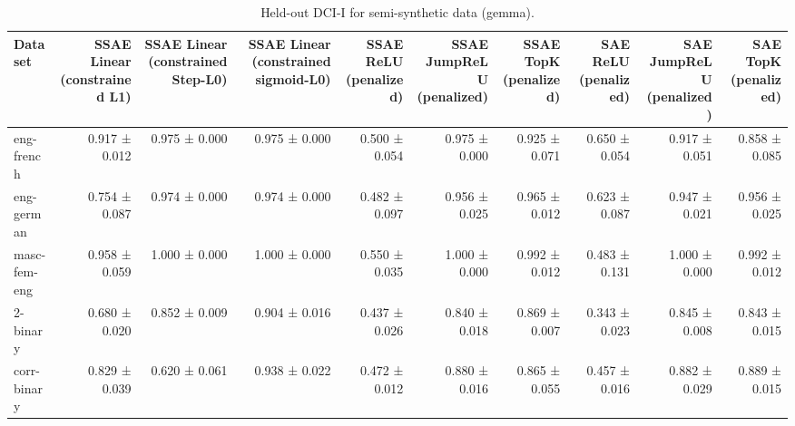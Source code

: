\begin{table}[t]
\centering
\caption{Held-out DCI-I for semi-synthetic data (gemma).}
\label{tab:semisynthetic-gemma-dci-i}
\begin{tabular}{lrrrrrrrrr}
\toprule
Dataset & SSAE Linear (constrained L1) & SSAE Linear (constrained Step-L0) & SSAE Linear (constrained sigmoid-L0) & SSAE ReLU (penalized) & SSAE JumpReLU (penalized) & SSAE TopK (penalized) & SAE ReLU (penalized) & SAE JumpReLU (penalized) & SAE TopK (penalized) \\
\midrule
eng-french & 0.917 ± 0.012 & 0.975 ± 0.000 & 0.975 ± 0.000 & 0.500 ± 0.054 & 0.975 ± 0.000 & 0.925 ± 0.071 & 0.650 ± 0.054 & 0.917 ± 0.051 & 0.858 ± 0.085 \\
eng-german & 0.754 ± 0.087 & 0.974 ± 0.000 & 0.974 ± 0.000 & 0.482 ± 0.097 & 0.956 ± 0.025 & 0.965 ± 0.012 & 0.623 ± 0.087 & 0.947 ± 0.021 & 0.956 ± 0.025 \\
masc-fem-eng & 0.958 ± 0.059 & 1.000 ± 0.000 & 1.000 ± 0.000 & 0.550 ± 0.035 & 1.000 ± 0.000 & 0.992 ± 0.012 & 0.483 ± 0.131 & 1.000 ± 0.000 & 0.992 ± 0.012 \\
2-binary & 0.680 ± 0.020 & 0.852 ± 0.009 & 0.904 ± 0.016 & 0.437 ± 0.026 & 0.840 ± 0.018 & 0.869 ± 0.007 & 0.343 ± 0.023 & 0.845 ± 0.008 & 0.843 ± 0.015 \\
corr-binary & 0.829 ± 0.039 & 0.620 ± 0.061 & 0.938 ± 0.022 & 0.472 ± 0.012 & 0.880 ± 0.016 & 0.865 ± 0.055 & 0.457 ± 0.016 & 0.882 ± 0.029 & 0.889 ± 0.015 \\
\bottomrule
\end{tabular}
\end{table}
